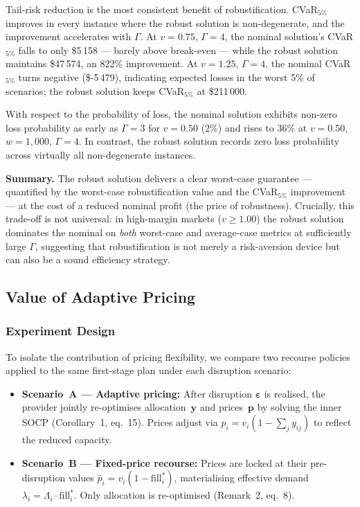 Tail-risk reduction is the most consistent benefit of robustification.
CVaR$_{5\%}$ improves in every instance where the robust solution is
non-degenerate, and the improvement accelerates with $\Gamma$.
At $v = 0.75$, $\Gamma = 4$, the nominal solution's CVaR$_{5\%}$ falls
to only \$5\,158 — barely above break-even — while the robust solution
maintains \$47\,574, an 822\% improvement.
At $v = 1.25$, $\Gamma = 4$, the nominal CVaR$_{5\%}$ turns negative
(\$-5\,479), indicating expected losses in the worst 5\% of scenarios;
the robust solution keeps CVaR$_{5\%}$ at \$211\,000.

With respect to the probability of loss, the nominal solution exhibits
non-zero loss probability as early as $\Gamma = 3$ for $v = 0.50$
(2\%) and rises to 36\% at $v = 0.50$, $w = 1{,}000$, $\Gamma = 4$.
In contrast, the robust solution records zero loss probability across
virtually all non-degenerate instances.

\medskip
\noindent\textbf{Summary.}
The robust solution delivers a clear worst-case guarantee — quantified
by the worst-case robustification value and the CVaR$_{5\%}$ improvement
— at the cost of a reduced nominal profit (the price of robustness).
Crucially, this trade-off is not universal: in high-margin markets
($v \geq 1.00$) the robust solution dominates the nominal on
\emph{both} worst-case and average-case metrics at sufficiently large
$\Gamma$, suggesting that robustification is not merely a risk-aversion
device but can also be a sound efficiency strategy.


\subsection{Value of Adaptive Pricing}
\label{subsec:value_adaptive_pricing}

\subsubsection*{Experiment Design}

To isolate the contribution of pricing flexibility, we compare two
recourse policies applied to the same first-stage plan under each
disruption scenario:
\begin{itemize}
  \item \textbf{Scenario~A — Adaptive pricing:} After disruption
    $\boldsymbol{\varepsilon}$ is realised, the provider jointly
    re-optimises allocation~$\mathbf{y}$ and prices~$\mathbf{p}$
    by solving the inner SOCP (Corollary~1, eq.~15).
    Prices adjust via $p_i = v_i(1 - \sum_j y_{ij})$ to reflect the
    reduced capacity.
  \item \textbf{Scenario~B — Fixed-price recourse:} Prices are locked
    at their pre-disruption values $\hat{p}_i = v_i(1 - \text{fill}_i^*)$,
    materialising effective demand $\lambda_i = \Lambda_i \cdot \text{fill}_i^*$.
    Only allocation is re-optimised (Remark~2, eq.~8).
\end{itemize}

